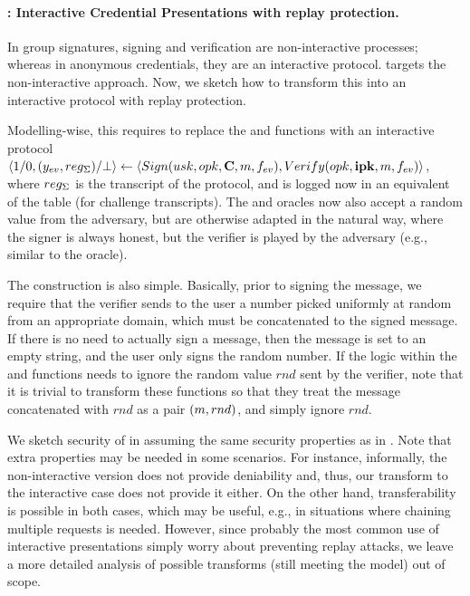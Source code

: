 \paragraph{\CUASGenInt: Interactive Credential Presentations with replay
  protection.}
%
In group signatures, signing and verification are non-interactive processes;
whereas in anonymous credentials, they are an interactive protocol. \CUASGen
targets the non-interactive approach. Now, we sketch how to transform this into
an interactive protocol with replay protection.

Modelling-wise, this requires to replace the \Sign and \Verify functions with
an interactive protocol $\langle 1/0,(y_{ev},reg_{\Sigma})/\bot \rangle \gets
\langle Sign(usk,opk,\mathbf{C},m,f_{ev}), Verify(opk,\mathbf{ipk},m,f_{ev})
\rangle$,
where $reg_{\Sigma}$ is the transcript of the protocol, and is logged now in
an equivalent of the \SIG table (\CSIG for challenge transcripts). The \SIGN
and \CHALb oracles now also accept a random value from the adversary, but
are otherwise adapted in the natural way, where the signer is always honest, but
the verifier is played by the adversary (e.g., similar to the \OBTAIN oracle).

The construction is also simple. Basically, prior to signing the message, we
require that the verifier sends to the user a number picked uniformly at random
from an appropriate domain, which must be concatenated to the signed message. If
there is no need to actually sign a message, then the message is set to an empty
string, and the user only signs the random number.
%
If the logic within the \feval and \finsp functions needs to ignore the random
value $rnd$ sent by the verifier, note that it is trivial to transform these
functions so that they treat the message concatenated with $rnd$ as a pair
$(m,rnd)$, and simply ignore $rnd$.

We sketch security of \CUASGenInt in  assuming
the same security properties as in \UAS. Note that extra properties may be
needed in some scenarios. For instance, informally, the non-interactive version
does not provide deniability and, thus, our transform to the interactive case
does not provide it either. On the other hand, transferability is possible in
both cases, which may be useful, e.g., in situations where chaining multiple
requests is needed.
%
However, since probably the most common use of interactive presentations simply
worry about preventing replay attacks, we leave a more detailed analysis of
possible transforms (still meeting the \UAS model) out of scope.

